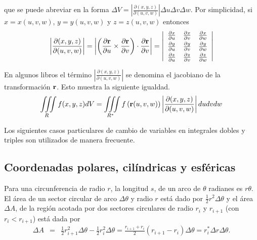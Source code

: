 que se puede abreviar en la forma
$\Delta V=\left\vert \frac{\partial (x,y,z) }{\partial \left(
u,v,w\right) }\right\vert \Delta u\Delta v\Delta w$.
Por simplicidad, si $x=x(u,v,w) $, $y=y(u,v,w) $ y $z=z(u,v,w) $ entonces
\begin{equation}
\left\vert \frac{\partial (x,y,z) }{\partial(u,v,w)}\right\vert =\left\vert\left(\frac{\partial{\bf r}}{\partial u}\times \frac{\partial{\bf r}}{\partial v}\right) \cdot \frac{\partial{\bf r}}{\partial v}\right\vert =
\left\vert
\begin{array}{ccc}\frac{\partial x}{\partial u}&\frac{\partial x}{\partial v}&\frac{\partial x}{\partial w}\\[.1cm]
\frac{\partial y}{\partial u}&\frac{\partial y}{\partial v}&\frac{\partial y}{\partial w} \\[0.1cm]
\frac{\partial z}{\partial u}&\frac{\partial z}{\partial v}&\frac{\partial z}{\partial w}
\end{array}\right\vert
\end{equation}

En algunos libros el término $\left\vert \frac{\partial\left(x,y,z\right)}{\partial(u,v,w)}\right\vert$
se denomina el jacobiano de la transformación ${\bf r}$. 
Esto muestra la siguiente igualdad.
\begin{equation}
\iiint\limits_{R}f(x,y,z) dV=\iiint\limits_{R^{\ast}}f\left({\bf r}(u,v,w) \right)\left\vert\frac{\partial (x,y,z)}{\partial (u,v,w) }\right\vert dudvdw
\end{equation}

Los siguientes casos particulares de cambio de variables en integrales dobles y triples son utilizados
de manera frecuente.

\subsection{Coordenadas polares, cilíndricas y esféricas} \label{esfericas}
  

Para una circunferencia de radio $r$, la longitud $s$, de un arco de $\theta$ radianes es $r\theta$.
El área de un sector circular de arco $\Delta \theta$ y radio $r$ está dado por
$\frac{1}{2}r^2 \Delta \theta$ y el área $\Delta A$, de la región acotada por dos sectores
circulares de radio $r_i$ y $r_{i+1}$ (con $r_i<r_{i+1}$) está dada por
\begin{eqnarray*}
\Delta A &=& \frac{1}{2}r_{i+1}^2 \Delta \theta-\frac{1}{2}r_{i}^2 \Delta \theta
= \frac{r_{i+1}+r_i}{2}(r_{i+1}-r_i)\Delta \theta  = r_i^*\Delta r \Delta \theta.
\end{eqnarray*}

